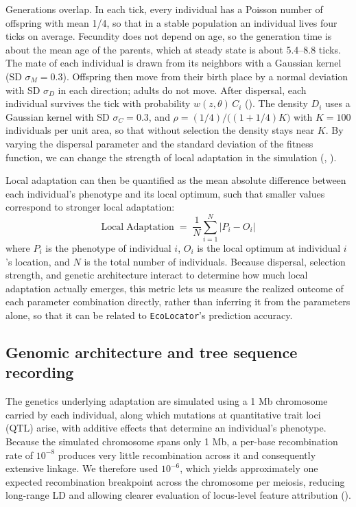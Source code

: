 \documentclass[]{article}
\newcommand{\ecolocator}{\texttt{EcoLocator}\xspace}
\providecommand{\llabel}[1]{}%
\begin{document}
Generations overlap.
In each tick, every individual has a Poisson number of offspring
with mean 1/4,
so that in a stable population an individual lives four ticks on average.
Fecundity does not depend on age,
so the generation time is about the mean age of the parents,
which at steady state is about 5.4--8.8 ticks.
The mate of each individual is drawn from its neighbors
with a Gaussian kernel (SD $\sigma_M = 0.3$).
Offspring then move from their birth place
by a normal deviation with SD $\sigma_D$ in each direction;
adults do not move.
After dispersal, each individual survives the tick
with probability $w(z, \theta)\, C_i$ ().
The density $D_i$ uses a Gaussian kernel with SD $\sigma_C = 0.3$,
and $\rho = (1/4) / \big((1 + 1/4) K\big)$
with $K = 100$ individuals per unit area,\llabel{simK}
so that without selection the density stays near $K$.
By varying the dispersal parameter
and the standard deviation of the fitness function,
we can change the strength of local adaptation
in the simulation (, ).

Local adaptation can then be quantified
as the mean absolute difference between each individual's phenotype
and its local optimum,
such that smaller values correspond to stronger local adaptation:
\begin{equation}
\mathrm{Local\;Adaptation} \;=\;
\frac{1}{N} \sum_{i=1}^{N} \left| P_i - O_i \right|
\label{eq:localadapt}
\end{equation}
where $P_i$ is the phenotype of individual $i$, $O_i$ is the local optimum at 
individual $i$'s location, and $N$ is the total number of individuals.
Because dispersal, selection strength, and genetic architecture
interact to determine how much local adaptation actually emerges,
this metric lets us measure the realized outcome of each parameter 
combination directly, rather than inferring it from the parameters alone,
so that it can be related to \ecolocator's prediction accuracy. 

\subsection{Genomic architecture and tree sequence recording}
The genetics underlying adaptation are simulated using a 1 Mb chromosome 
carried by each individual, 
along which mutations at quantitative trait loci (QTL) 
arise, with additive effects that determine an individual's phenotype.
Because the simulated chromosome spans only 1 Mb,
a per-base recombination rate of \(10^{-8}\)
produces very little recombination across it
and consequently extensive linkage.
We therefore used \(10^{-6}\),
which yields approximately one expected recombination breakpoint
across the chromosome per meiosis,
reducing long-range LD and allowing clearer evaluation of locus-level
feature attribution ().
\end{document}
